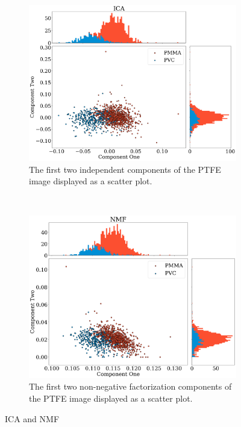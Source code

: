 \documentclass[a4paper,11pt]{article}
\begin{document}
\begin{figure}[htbp]
    \centering
    \begin{subfigure}[b]{0.48\textwidth}
        \includegraphics[width=\textwidth]{figures/ICAnone.png}
    \caption{The first two independent components of the PTFE image displayed as a scatter plot.}
  
    \label{ICA}
    \end{subfigure}
    ~ %
    \begin{subfigure}[b]{0.48\textwidth}
        \includegraphics[width=\textwidth]{figures/NMFnone.png}
    \caption{The first two non-negative factorization components of the PTFE image displayed as a scatter plot.}
  
    \label{NMF}
    \end{subfigure}
  \caption{ICA and NMF}
  
  \label{NMF_ICA}
\end{figure}
\end{document}
